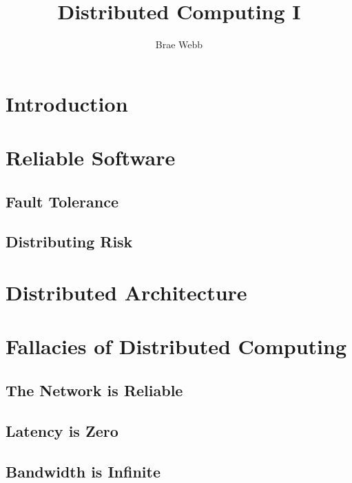 \title{Distributed Computing I}
\author{Brae Webb}
\date{}

\maketitle

\section{Introduction}

\section{Reliable Software}

\subsection{Fault Tolerance}

\subsection{Distributing Risk}

\section{Distributed Architecture}


\section{Fallacies of Distributed Computing}
\subsection{The Network is Reliable}

\subsection{Latency is Zero}

\subsection{Bandwidth is Infinite}

